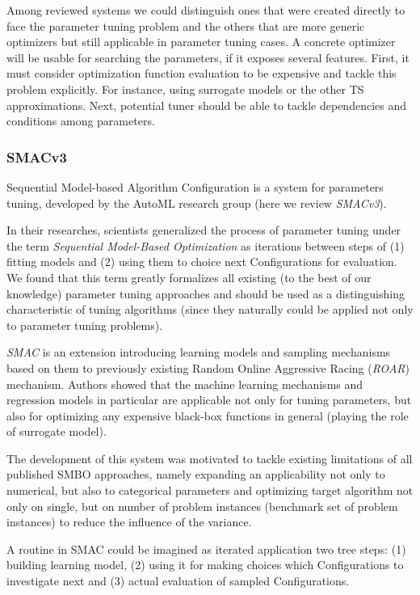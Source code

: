 Among reviewed systems we could distinguish ones that were created directly to face the parameter tuning problem and the others that are more generic optimizers but still applicable in parameter tuning cases.
A concrete optimizer will be usable for searching the parameters, if it exposes several features. First, it must consider optimization function evaluation to be expensive and tackle this problem explicitly. For instance, using surrogate models or the other TS approximations. Next, potential tuner should be able to tackle dependencies and conditions among parameters.

\subsubsection{SMACv3~\cite{hutter2011sequential}}\label{bg: smac}
Sequential Model-based Algorithm Configuration is a system for parameters tuning, developed by the AutoML research group (here we review \textit{SMACv3}). 

In their researches, scientists generalized the process of parameter tuning under the term \textit{Sequential Model-Based Optimization} as iterations between steps of (1) fitting models and (2) using them to choice next Configurations for evaluation. 
We found that this term greatly formalizes all existing (to the best of our knowledge) parameter tuning approaches and should be used as a distinguishing characteristic of tuning algorithms (since they naturally could be applied not only to parameter tuning problems).

\textit{SMAC} is an extension introducing learning models and sampling mechanisms based on them to previously existing Random Online Aggressive Racing (\textit{ROAR}) mechanism. Authors showed that the machine learning mechanisms and regression models in particular are applicable not only for tuning parameters, but also for optimizing any expensive black-box functions in general (playing the role of surrogate model). 

The development of this system was motivated to tackle existing limitations of all published SMBO approaches, namely expanding an applicability not only to numerical, but also to categorical parameters and optimizing target algorithm not only on single, but on number of problem instances (benchmark set of problem instances) to reduce the influence of the variance.

A routine in SMAC could be imagined as iterated application two tree steps: (1) building learning model, (2) using it for making choices which Configurations to investigate next and (3) actual evaluation of sampled Configurations.

